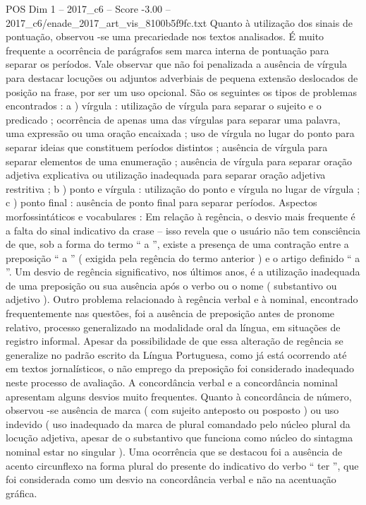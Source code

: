 \begin{textsample}{POS Dim 1 – 2017\_c6 – Score -3.00 – 2017\_c6/enade\_2017\_art\_vis\_8100b5f9fc.txt}
Quanto à utilização dos sinais de pontuação, observou -se uma precariedade nos textos analisados.
É muito frequente a ocorrência de parágrafos sem marca interna de pontuação para separar os períodos.
Vale observar que não foi penalizada a ausência de vírgula para destacar locuções ou adjuntos adverbiais de pequena extensão deslocados de posição na frase, por ser um uso opcional.
São os seguintes os tipos de problemas encontrados : a ) vírgula : utilização de vírgula para separar o sujeito e o predicado ; ocorrência de apenas uma das vírgulas para separar uma palavra, uma expressão ou uma oração encaixada ; uso de vírgula no lugar do ponto para separar ideias que constituem períodos distintos ; ausência de vírgula para separar elementos de uma enumeração ; ausência de vírgula para separar oração adjetiva explicativa ou utilização inadequada para separar oração adjetiva restritiva ; b ) ponto e vírgula : utilização do ponto e vírgula no lugar de vírgula ; c ) ponto final : ausência de ponto final para separar períodos.
Aspectos morfossintáticos e vocabulares : Em relação à regência, o desvio mais frequente é a falta do sinal indicativo da crase – isso revela que o usuário não tem consciência de que, sob a forma do termo “ a ”, existe a presença de uma contração entre a preposição “ a ” ( exigida pela regência do termo anterior ) e o artigo definido “ a ”.
Um desvio de regência significativo, nos últimos anos, é a utilização inadequada de uma preposição ou sua ausência após o verbo ou o nome ( substantivo ou adjetivo ).
Outro problema relacionado à regência verbal e à nominal, encontrado frequentemente nas questões, foi a ausência de preposição antes de pronome relativo, processo generalizado na modalidade oral da língua, em situações de registro informal.
Apesar da possibilidade de que essa alteração de regência se generalize no padrão escrito da Língua Portuguesa, como já está ocorrendo até em textos jornalísticos, o não emprego da preposição foi considerado inadequado neste processo de avaliação.
A concordância verbal e a concordância nominal apresentam alguns desvios muito frequentes.
Quanto à concordância de número, observou -se ausência de marca ( com sujeito anteposto ou posposto ) ou uso indevido ( uso inadequado da marca de plural comandado pelo núcleo plural da locução adjetiva, apesar de o substantivo que funciona como núcleo do sintagma nominal estar no singular ).
Uma ocorrência que se destacou foi a ausência de acento circunflexo na forma plural do presente do indicativo do verbo “ ter ”, que foi considerada como um desvio na concordância verbal e não na acentuação gráfica.

\end{textsample}

